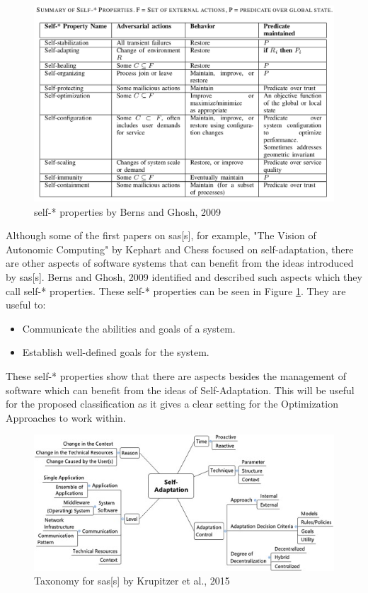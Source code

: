 \begin{figure}[t!]
    \includegraphics[width=\textwidth]{images/SelfProperties.png}
    \caption{self-* properties by Berns and Ghosh, 2009 \cite*{DissectingSelfProperties}}
    \label{fig:SelfProperties}
\end{figure}
\noindent Although some of the first papers on \acrlong{sas}[s], for example, 
"The Vision of Autonomic Computing" by Kephart and Chess \cite*{VisionOfAutonomicComputing} focused on self-adaptation,
there are other aspects of software systems that can benefit from the ideas introduced by \acrlong{sas}[s].
Berns and Ghosh, 2009 \cite*{DissectingSelfProperties} identified and described such aspects which they call self-* properties.
These self-* properties can be seen in Figure \ref{fig:SelfProperties}.
They are useful to:
\begin{itemize}[nosep]
    \item Communicate the abilities and goals of a system.
    \item Establish well-defined goals for the system.
\end{itemize}



\noindent These self-* properties show that there are aspects besides the management of software which can benefit from the ideas of Self-Adaptation.
This will be useful for the proposed classification as it gives a clear setting for the Optimization Approaches to work within.

\begin{figure}[t!]
    \includegraphics[width=\textwidth]{images/KrupitzerTaxonomy.jpg}
    \caption{Taxonomy for \acrlong{sas}[s] by Krupitzer et al., 2015 \cite*{SurveyOnEngineeringApproaches}}
    \label{fig:KrupitzerTaxonomy}
\end{figure}

